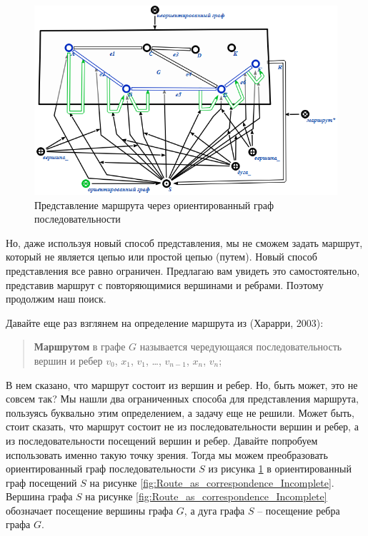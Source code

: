 \begin{figure}
  \centering
  \includegraphics[scale=0.8]{images/2/Route_as_sequence}
  \caption{Представление маршрута через ориентированный граф последовательности}
  \label{fig:Route_as_sequence}
\end{figure}

Но, даже используя новый способ представления, мы не сможем задать
маршрут, который не является цепью или простой цепью (путем). Новый
способ представления все равно ограничен. Предлагаю вам увидеть это
самостоятельно, представив маршрут с повторяющимися вершинами и
ребрами. Поэтому продолжим наш поиск.

Давайте еще раз взглянем на определение маршрута из (Харарри, 2003):

\begin{quotation}
  \textbf{Маршрутом} в графе $G$ называется чередующаяся
  последовательность вершин и ребер $v_0$, $x_1$, $v_1$, …, $v_{n-1}$,
  $x_n$, $v_n$;
\end{quotation}

В нем сказано, что маршрут состоит из вершин и ребер. Но, быть может,
это не совсем так? Мы нашли два ограниченных способа для представления
маршрута, пользуясь буквально этим определением, а задачу еще не
решили. Может быть, стоит сказать, что маршрут состоит не из
последовательности вершин и ребер, а из последовательности посещений
вершин и ребер. Давайте попробуем использовать именно такую точку
зрения. Тогда мы можем преобразовать ориентированный граф
последовательности $S$ из рисунка \ref{fig:Route_as_sequence} в
ориентированный граф посещений $S$ на рисунке
\ref{fig:Route_as_correspondence_Incomplete}. Вершина графа $S$ на
рисунке \ref{fig:Route_as_correspondence_Incomplete} обозначает
посещение вершины графа $G$, а дуга графа $S$ – посещение ребра графа
$G$.

